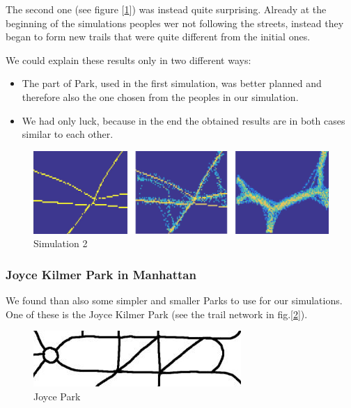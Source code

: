 \documentclass[11pt]{article}
\begin{document}
The second one (see figure [\ref{GreenPark2}]) was instead quite surprising. Already at the beginning of the simulations peoples wer not following the streets, instead they began to form new trails that were quite different from the initial ones. 

We could explain these results only in two different ways:
\begin{itemize}
\item The part of Park, used in the first simulation, was better planned and therefore also the one chosen from the peoples in our simulation. 
\item We had only luck, because in the end the obtained results are in both cases similar to each other. 
\end{itemize}

\begin{figure}[H]
        \centering
        \includegraphics[width=\columnwidth]{GreenPark2.jpg}
        \caption{Simulation 2}
        \label{GreenPark2}
\end{figure}

\subsubsection{Joyce Kilmer Park in Manhattan}
We found than also some simpler and smaller Parks to use for our simulations. One of these is the Joyce Kilmer Park (see the trail network in fig.[\ref{Joyce_Park}]). 

\begin{figure}[H]
        \centering
        \includegraphics[width=\columnwidth]{Joyce_Park.jpg}
        \caption{Joyce Park}
        \label{Joyce_Park}
\end{figure}
\end{document}
